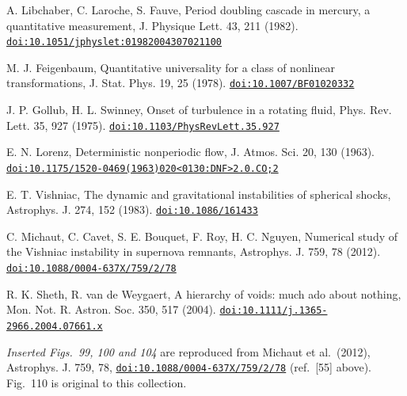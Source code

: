 \documentclass[11pt,a4paper]{article}
\begin{document}
\begin{description}[leftmargin=2.6em,labelwidth=2.2em,labelsep=0.4em,itemsep=1pt,parsep=0pt,font=\normalfont]
\item[{[50]}] A. Libchaber, C. Laroche, S. Fauve, Period doubling cascade in mercury, a quantitative measurement, J. Physique Lett. 43, 211 (1982). \href{https://doi.org/10.1051/jphyslet:01982004307021100}{\nolinkurl{doi:10.1051/jphyslet:01982004307021100}}
\item[{[51]}] M. J. Feigenbaum, Quantitative universality for a class of nonlinear transformations, J. Stat. Phys. 19, 25 (1978). \href{https://doi.org/10.1007/BF01020332}{\nolinkurl{doi:10.1007/BF01020332}}
\item[{[52]}] J. P. Gollub, H. L. Swinney, Onset of turbulence in a rotating fluid, Phys. Rev. Lett. 35, 927 (1975). \href{https://doi.org/10.1103/PhysRevLett.35.927}{\nolinkurl{doi:10.1103/PhysRevLett.35.927}}
\item[{[53]}] E. N. Lorenz, Deterministic nonperiodic flow, J. Atmos. Sci. 20, 130 (1963). \href{https://doi.org/10.1175/1520-0469(1963)020<0130:DNF>2.0.CO;2}{\nolinkurl{doi:10.1175/1520-0469(1963)020<0130:DNF>2.0.CO;2}}
\item[{[54]}] E. T. Vishniac, The dynamic and gravitational instabilities of spherical shocks, Astrophys. J. 274, 152 (1983). \href{https://doi.org/10.1086/161433}{\nolinkurl{doi:10.1086/161433}}
\item[{[55]}] C. Michaut, C. Cavet, S. E. Bouquet, F. Roy, H. C. Nguyen, Numerical study of the Vishniac instability in supernova remnants, Astrophys. J. 759, 78 (2012). \href{https://doi.org/10.1088/0004-637X/759/2/78}{\nolinkurl{doi:10.1088/0004-637X/759/2/78}}
\item[{[56]}] R. K. Sheth, R. van de Weygaert, A hierarchy of voids: much ado about nothing, Mon. Not. R. Astron. Soc. 350, 517 (2004). \href{https://doi.org/10.1111/j.1365-2966.2004.07661.x}{\nolinkurl{doi:10.1111/j.1365-2966.2004.07661.x}}
\end{description}
\noindent\textit{Inserted Figs.~99, 100 and 104} are reproduced from Michaut et al.\ (2012), Astrophys. J. 759, 78, \href{https://doi.org/10.1088/0004-637X/759/2/78}{\nolinkurl{doi:10.1088/0004-637X/759/2/78}} (ref.~[55] above). Fig.~110 is original to this collection.
\end{document}

